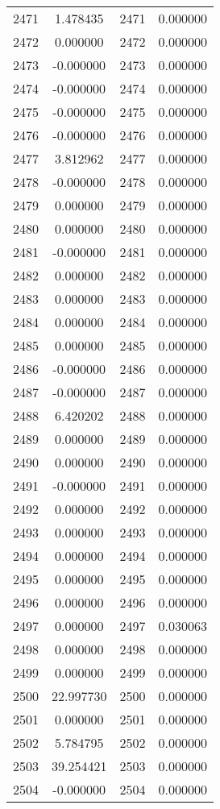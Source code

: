 \documentclass[12pt]{article}
\begin{document}
\begin{longtable}{@{}cccc@{}}
2471 & 1.478435 & 2471 & 0.000000 \\
2472 & 0.000000 & 2472 & 0.000000 \\
2473 & -0.000000 & 2473 & 0.000000 \\
2474 & -0.000000 & 2474 & 0.000000 \\
2475 & -0.000000 & 2475 & 0.000000 \\
2476 & -0.000000 & 2476 & 0.000000 \\
2477 & 3.812962 & 2477 & 0.000000 \\
2478 & -0.000000 & 2478 & 0.000000 \\
2479 & 0.000000 & 2479 & 0.000000 \\
2480 & 0.000000 & 2480 & 0.000000 \\
2481 & -0.000000 & 2481 & 0.000000 \\
2482 & 0.000000 & 2482 & 0.000000 \\
2483 & 0.000000 & 2483 & 0.000000 \\
2484 & 0.000000 & 2484 & 0.000000 \\
2485 & 0.000000 & 2485 & 0.000000 \\
2486 & -0.000000 & 2486 & 0.000000 \\
2487 & -0.000000 & 2487 & 0.000000 \\
2488 & 6.420202 & 2488 & 0.000000 \\
2489 & 0.000000 & 2489 & 0.000000 \\
2490 & 0.000000 & 2490 & 0.000000 \\
2491 & -0.000000 & 2491 & 0.000000 \\
2492 & 0.000000 & 2492 & 0.000000 \\
2493 & 0.000000 & 2493 & 0.000000 \\
2494 & 0.000000 & 2494 & 0.000000 \\
2495 & 0.000000 & 2495 & 0.000000 \\
2496 & 0.000000 & 2496 & 0.000000 \\
2497 & 0.000000 & 2497 & 0.030063 \\
2498 & 0.000000 & 2498 & 0.000000 \\
2499 & 0.000000 & 2499 & 0.000000 \\
2500 & 22.997730 & 2500 & 0.000000 \\
2501 & 0.000000 & 2501 & 0.000000 \\
2502 & 5.784795 & 2502 & 0.000000 \\
2503 & 39.254421 & 2503 & 0.000000 \\
2504 & -0.000000 & 2504 & 0.000000 \\

\end{longtable}
\end{document}
